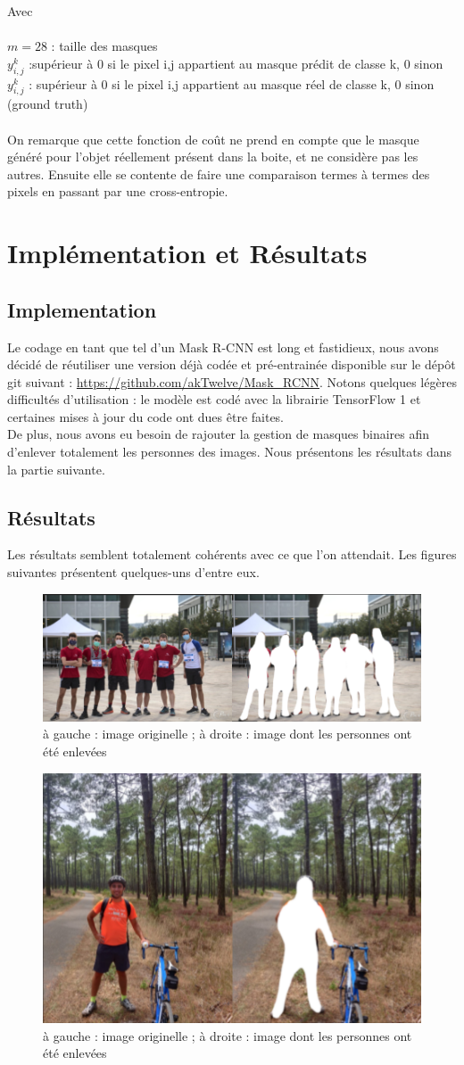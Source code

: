 Avec \\
\\
$m = 28$ : taille des masques \\
$y^k_{i,j}$ :supérieur à 0 si le pixel i,j appartient au masque prédit de classe k, 0 sinon \\
$y^k_{i,j}$ : supérieur à 0 si le pixel i,j appartient au masque réel de classe k, 0 sinon (ground truth)\\ 
\\
On remarque que cette fonction de coût ne prend en compte que le masque généré pour l'objet réellement présent dans la boite, et ne considère pas les autres. Ensuite elle se contente de faire une comparaison termes à termes des pixels en passant par une cross-entropie.

\section{Implémentation et Résultats}

\subsection{Implementation}

Le codage en tant que tel d'un Mask R-CNN est long et fastidieux, nous avons décidé de réutiliser une version déjà codée et pré-entrainée disponible sur le dépôt git suivant : \url{https://github.com/akTwelve/Mask_RCNN}. Notons quelques légères difficultés d'utilisation : le modèle est codé avec la librairie TensorFlow 1 et certaines mises à jour du code ont dues être faites. \\
De plus, nous avons eu besoin de rajouter la gestion de masques binaires afin d'enlever totalement les personnes des images. Nous présentons les résultats dans la partie suivante.

\subsection{Résultats}

Les résultats semblent totalement cohérents avec ce que l'on attendait. Les figures suivantes présentent quelques-uns d'entre eux.

\begin{figure}[!h]
\centering
\includegraphics[width=200pts]{images/Mask_R_CNN/resultats_masks_1.png} 
\caption{à gauche : image originelle ; à droite : image dont les personnes ont été enlevées}
\end{figure}

\begin{figure}[!h]
\centering
\includegraphics[width=200pts]{images/Mask_R_CNN/resultats_masks_2.png} 
\caption{à gauche : image originelle ; à droite : image dont les personnes ont été enlevées}
\end{figure}